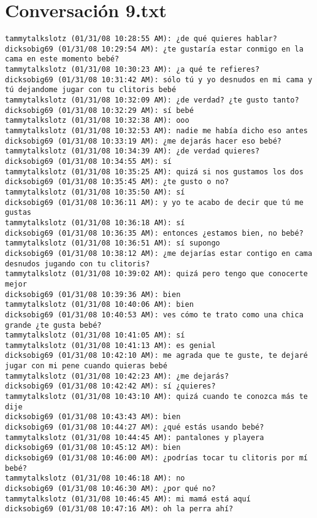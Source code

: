 \section{Conversaci\'on 9.txt}

\begin{verbatim}
tammytalkslotz (01/31/08 10:28:55 AM): ¿de qué quieres hablar?
dicksobig69 (01/31/08 10:29:54 AM): ¿te gustaría estar conmigo en la cama en este momento bebé?
tammytalkslotz (01/31/08 10:30:23 AM): ¿a qué te refieres?
dicksobig69 (01/31/08 10:31:42 AM): sólo tú y yo desnudos en mi cama y tú dejandome jugar con tu clitoris bebé
tammytalkslotz (01/31/08 10:32:09 AM): ¿de verdad? ¿te gusto tanto?
dicksobig69 (01/31/08 10:32:29 AM): sí bebé
tammytalkslotz (01/31/08 10:32:38 AM): ooo
tammytalkslotz (01/31/08 10:32:53 AM): nadie me había dicho eso antes
dicksobig69 (01/31/08 10:33:19 AM): ¿me dejarás hacer eso bebé?
tammytalkslotz (01/31/08 10:34:39 AM): ¿de verdad quieres?
dicksobig69 (01/31/08 10:34:55 AM): sí
tammytalkslotz (01/31/08 10:35:25 AM): quizá si nos gustamos los dos
dicksobig69 (01/31/08 10:35:45 AM): ¿te gusto o no?
tammytalkslotz (01/31/08 10:35:50 AM): sí
dicksobig69 (01/31/08 10:36:11 AM): y yo te acabo de decir que tú me gustas
tammytalkslotz (01/31/08 10:36:18 AM): sí
dicksobig69 (01/31/08 10:36:35 AM): entonces ¿estamos bien, no bebé?
tammytalkslotz (01/31/08 10:36:51 AM): sí supongo
dicksobig69 (01/31/08 10:38:12 AM): ¿me dejarías estar contigo en cama desnudos jugando con tu clitoris?
tammytalkslotz (01/31/08 10:39:02 AM): quizá pero tengo que conocerte mejor
dicksobig69 (01/31/08 10:39:36 AM): bien
tammytalkslotz (01/31/08 10:40:06 AM): bien
dicksobig69 (01/31/08 10:40:53 AM): ves cómo te trato como una chica grande ¿te gusta bebé?
tammytalkslotz (01/31/08 10:41:05 AM): sí
tammytalkslotz (01/31/08 10:41:13 AM): es genial
dicksobig69 (01/31/08 10:42:10 AM): me agrada que te guste, te dejaré jugar con mi pene cuando quieras bebé
tammytalkslotz (01/31/08 10:42:23 AM): ¿me dejarás?
dicksobig69 (01/31/08 10:42:42 AM): sí ¿quieres?
tammytalkslotz (01/31/08 10:43:10 AM): quizá cuando te conozca más te dije
dicksobig69 (01/31/08 10:43:43 AM): bien
dicksobig69 (01/31/08 10:44:27 AM): ¿qué estás usando bebé?
tammytalkslotz (01/31/08 10:44:45 AM): pantalones y playera
dicksobig69 (01/31/08 10:45:12 AM): bien
dicksobig69 (01/31/08 10:46:00 AM): ¿podrías tocar tu clitoris por mí bebé?
tammytalkslotz (01/31/08 10:46:18 AM): no
dicksobig69 (01/31/08 10:46:30 AM): ¿por qué no?
tammytalkslotz (01/31/08 10:46:45 AM): mi mamá está aquí
dicksobig69 (01/31/08 10:47:16 AM): oh la perra ahí?

\end{verbatim}
